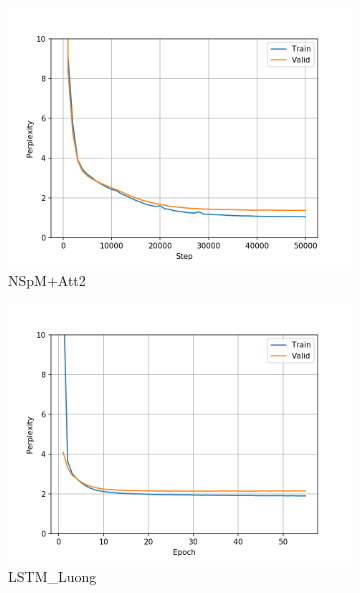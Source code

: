 \begin{figure}[h]
\begin{subfigure}{0.3\textwidth}
\includegraphics[width=\textwidth]{../results/dbnqa1/run1/neural_sparql_machine_luong_attention/ppls.png} 
\caption{NSpM+Att2}
\label{fig:dbnqa nsm-luo ppl}
\end{subfigure}
\hfill
\begin{subfigure}{0.3\textwidth}
\includegraphics[width=\textwidth]{../results/dbnqa1/run1/lstm_luong_wmt_en_de/ppls.png}
\caption{LSTM\_Luong}
\label{fig:dbnqa lstm ppl}
\end{subfigure}
\hfill
\begin{subfigure}{0.3\textwidth}

\end{subfigure}
\end{figure}
